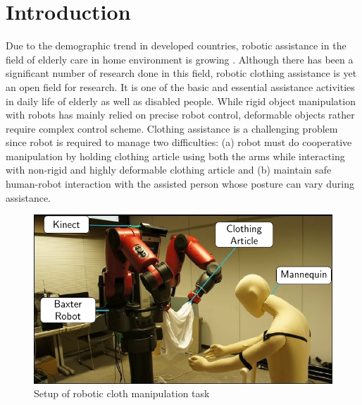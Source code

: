 \documentclass[sigconf]{acmart}
\begin{document}


\maketitle

\section{Introduction}
\label{sec:introduction}
Due to the demographic trend in developed countries, robotic assistance in the field of elderly care in home environment is growing \cite{broekens2009assistive}. Although there has been a significant number of research done in this field, robotic clothing assistance is yet an open field for research. It is one of the basic and essential assistance activities in daily life of elderly as well as disabled people. While rigid object manipulation with robots has mainly relied on precise robot control, deformable objects rather require complex control scheme. Clothing assistance is a challenging problem since robot is required to manage two difficulties: (a) robot must do cooperative manipulation by holding clothing article using both the arms while interacting with non-rigid and highly deformable clothing article and (b) maintain safe human-robot interaction with the assisted person whose posture can vary during assistance.

\begin{figure}
	\includegraphics[width=\linewidth]{setup}
	\caption{Setup of robotic cloth manipulation task}
	\label{fig:setup}
\end{figure}
\end{document}
